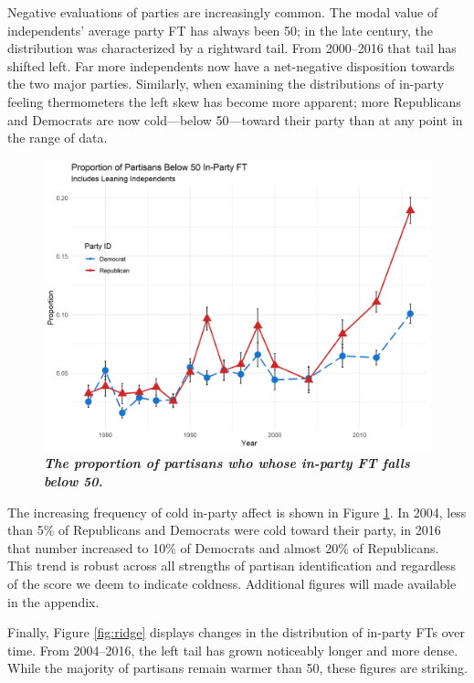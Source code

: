 \documentclass[12pt]{paper}
\begin{document}
Negative evaluations of parties are increasingly common. The modal value of independents' average party FT has always been 50; in the late  century, the distribution was characterized by a rightward tail. From 2000--2016 that tail has shifted left. Far more independents now have a net-negative disposition towards the two major parties. Similarly, when examining the distributions of in-party feeling thermometers the left skew has become more apparent; more Republicans and Democrats are now cold---below 50---toward their party than at any point in the range of data.

\begin{figure}
\centering
\includegraphics[width=.7\textwidth]{cdf-below-50-ns.png}
\caption{\label{fig:cdf-below-50} \textit{\textbf{The proportion of partisans who whose in-party FT falls below 50.} %
}}
\end{figure}

The increasing frequency of cold in-party affect is shown in Figure \ref{fig:cdf-below-50}. In 2004, less than 5\% of Republicans and Democrats were cold toward their party, in 2016 that number increased to 10\% of Democrats and almost 20\% of Republicans. This trend is robust across all strengths of partisan identification and regardless of the score we deem to indicate coldness. Additional figures will made available in the appendix.



Finally, Figure \ref{fig:ridge} displays changes in the distribution of in-party FTs over time. From 2004--2016, the left tail has grown noticeably longer and more dense. While the majority of partisans remain warmer than 50, these figures are striking.
\end{document}
